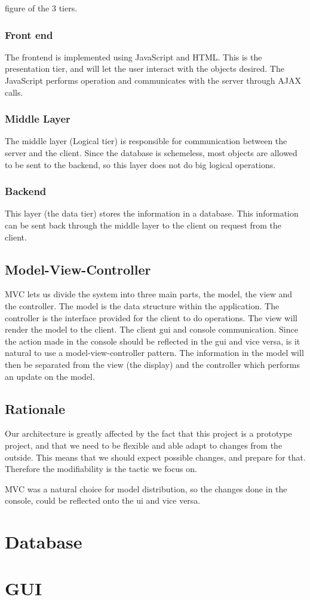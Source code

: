 figure of the 3 tiers. 

\subsubsection{Front end}
The frontend is implemented using JavaScript and HTML. This is the presentation tier, and will let the user interact with the objects desired. The JavaScript performs operation and communicates with the server through AJAX calls. 

\subsubsection{Middle Layer}
The middle layer (Logical tier) is responsible for communication between the server and the client. Since the database is schemeless, most objects are allowed to be sent to the backend, so this layer does not do big logical operations.

\subsubsection{Backend}
This layer (the data tier) stores the information in a database. This information can be sent back through the middle layer to the client on request from the client. 


\subsection{Model-View-Controller}
MVC lets us divide the system into three main parts, the model, the view and the controller. The model is the data structure within the application. The controller is the interface provided for the client to do operations. The view will render the model to the client. 
The client gui and console communication. Since the action made in the console should be reflected in the gui and vice versa, is it natural to use a model-view-controller pattern. The information in the model will then be separated from the view (the display) and the controller which performs an update on the model. 


\subsection{Rationale} \label{Rationale}
Our architecture is greatly affected by the fact that this project is a prototype project, and that we need to be flexible and able adapt to changes from the outside. This means that we should expect possible changes, and prepare for that. Therefore the modifiability is the tactic we focus on.

MVC was a natural choice for model distribution, so the changes done in the console, could be reflected onto the ui and vice versa. 

\section{Database}
\section{GUI}
